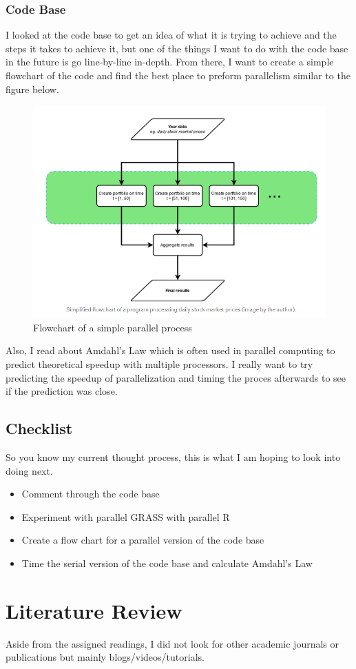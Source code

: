 \documentclass[a4paper,10pt]{article}
\begin{document}
\subsubsection{Code Base}
I looked at the code base to get an idea of what it is trying to achieve and the steps it takes to achieve it, but one of the things I 
want to do with the code base in the future is go line-by-line in-depth. From there, I want to create a simple flowchart of the code and 
find the best place to preform parallelism similar to the figure below.
\begin{figure}[h!]
    \caption{Flowchart of a simple parallel process}
    \centering
    \includegraphics[scale=0.3]{flowchart.png}
\end{figure}

Also, I read about Amdahl's Law which is often used in parallel computing to predict theoretical speedup with multiple processors. I really 
want to try predicting the speedup of parallelization and timing the proces afterwards to see if the prediction was close.

\subsection{Checklist}
So you know my current thought process, this is what I am hoping to look into doing next.
\begin{itemize}
    \item Comment through the code base
    \item Experiment with parallel GRASS with parallel R
    \item Create a flow chart for a parallel version of the code base
    \item Time the serial version of the code base and calculate Amdahl's Law
\end{itemize}

\section{Literature Review}
Aside from the assigned readings, I did not look for other academic journals or publications but mainly blogs/videos/tutorials.



\end{document}
